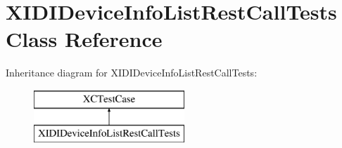 \hypertarget{interface_x_i_d_i_device_info_list_rest_call_tests}{}\section{X\+I\+D\+I\+Device\+Info\+List\+Rest\+Call\+Tests Class Reference}
\label{interface_x_i_d_i_device_info_list_rest_call_tests}
Inheritance diagram for X\+I\+D\+I\+Device\+Info\+List\+Rest\+Call\+Tests\+:\begin{figure}[H]
\begin{center}
\leavevmode
\includegraphics[height=2.000000cm]{interface_x_i_d_i_device_info_list_rest_call_tests}
\end{center}
\end{figure}

